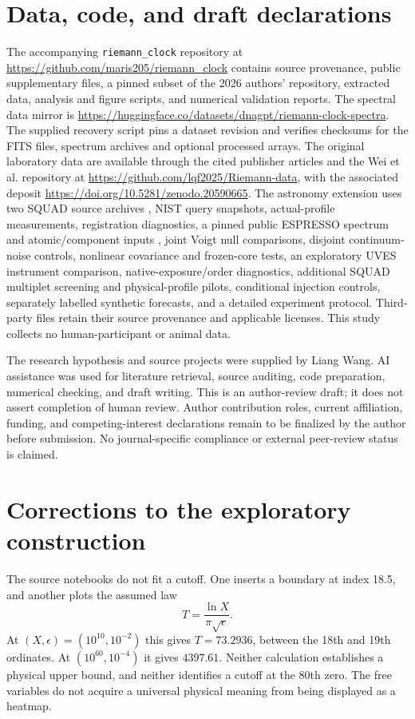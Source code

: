 \documentclass[aps,pra,onecolumn,amsmath,amssymb,nofootinbib,superscriptaddress,floatfix,11pt]{revtex4-2}
\begin{document}
\section*{Data, code, and draft declarations}
The accompanying \texttt{riemann\_clock} repository at \url{https://github.com/maris205/riemann_clock} contains source provenance, public supplementary files, a pinned subset of the 2026 authors' repository, extracted data, analysis and figure scripts, and numerical validation reports. The spectral data mirror is \url{https://huggingface.co/datasets/dnagpt/riemann-clock-spectra}. The supplied recovery script pins a dataset revision and verifies checksums for the FITS files, spectrum archives and optional processed arrays. The original laboratory data are available through the cited publisher articles and the Wei et al. repository at \url{https://github.com/lqf2025/Riemann-data}, with the associated deposit \url{https://doi.org/10.5281/zenodo.20590665}. The astronomy extension uses two SQUAD source archives \cite{Murphy2019SQUAD}, NIST query snapshots, actual-profile measurements, registration diagnostics, a pinned public ESPRESSO spectrum and atomic/component inputs \cite{Murphy2022ESPRESSO}, joint Voigt null comparisons, disjoint continuum-noise controls, nonlinear covariance and frozen-core tests, an exploratory UVES instrument comparison, native-exposure/order diagnostics, additional SQUAD multiplet screening and physical-profile pilots, conditional injection controls, separately labelled synthetic forecasts, and a detailed experiment protocol. Third-party files retain their source provenance and applicable licenses. This study collects no human-participant or animal data.

The research hypothesis and source projects were supplied by Liang Wang. AI assistance was used for literature retrieval, source auditing, code preparation, numerical checking, and draft writing. This is an author-review draft; it does not assert completion of human review. Author contribution roles, current affiliation, funding, and competing-interest declarations remain to be finalized by the author before submission. No journal-specific compliance or external peer-review status is claimed.

\appendix
\section{Corrections to the exploratory construction}
The source notebooks do not fit a cutoff. One inserts a boundary at index 18.5, and another plots the assumed law
\begin{equation}
 T=\frac{\ln X}{\pi\sqrt{\epsilon}}.
\end{equation}
At $(X,\epsilon)=(10^{10},10^{-2})$ this gives $T=73.2936$, between the 18th and 19th ordinates. At $(10^{60},10^{-4})$ it gives $4397.61$. Neither calculation establishes a physical upper bound, and neither identifies a cutoff at the 80th zero. The free variables do not acquire a universal physical meaning from being displayed as a heatmap.
\end{document}
